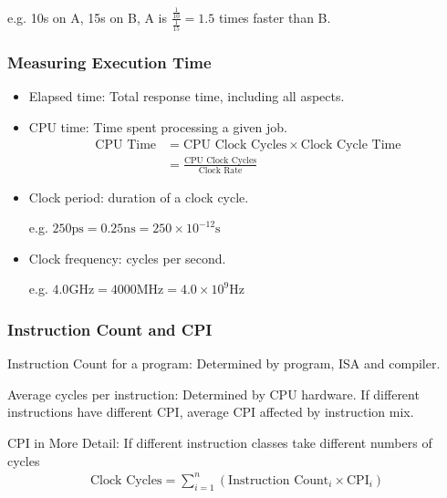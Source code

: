 e.g. 10s on A, 15s on B, A is $\frac{\frac{1}{10}}{\frac{1}{15}}=1.5$ times faster than B. 

\subsubsection{Measuring Execution Time}
\begin{itemize}
    \item Elapsed time: Total response time, including all aspects. 
    \item CPU time: Time spent processing a given job. 
    \begin{align*}
        \text{CPU Time}&=\text{CPU Clock Cycles} \times \text{Clock Cycle Time}\\
        &=\frac{\text{CPU Clock Cycles}}{\text{Clock Rate}}
    \end{align*}
    \item Clock period: duration of a clock cycle. 
    
    e.g. $250\mathrm{ps}=0.25\mathrm{ns}=250\times 10^{-12}\mathrm{s}$
    \item Clock frequency: cycles per second. 
    
    e.g. $4.0\mathrm{GHz}=4000\mathrm{MHz}=4.0\times 10^9\mathrm{Hz}$
\end{itemize}

\subsubsection{Instruction Count and CPI}


Instruction Count for a program: Determined by program, ISA and compiler. 

Average cycles per instruction: Determined by CPU hardware. If different instructions have different CPI, average CPI affected by instruction mix. 

CPI in More Detail: 
If different instruction classes take different numbers of cycles
\begin{align*}
    \text{Clock Cycles}=\sum_{i=1}^n (\text{Instruction Count}_i \times \text{CPI}_i)
\end{align*}

